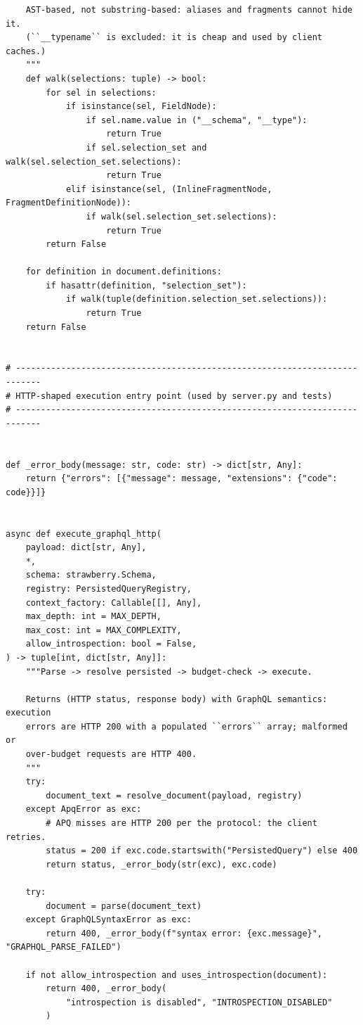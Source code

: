 \begin{verbatim}
    AST-based, not substring-based: aliases and fragments cannot hide it.
    (``__typename`` is excluded: it is cheap and used by client caches.)
    """
    def walk(selections: tuple) -> bool:
        for sel in selections:
            if isinstance(sel, FieldNode):
                if sel.name.value in ("__schema", "__type"):
                    return True
                if sel.selection_set and walk(sel.selection_set.selections):
                    return True
            elif isinstance(sel, (InlineFragmentNode, FragmentDefinitionNode)):
                if walk(sel.selection_set.selections):
                    return True
        return False

    for definition in document.definitions:
        if hasattr(definition, "selection_set"):
            if walk(tuple(definition.selection_set.selections)):
                return True
    return False


# ---------------------------------------------------------------------------
# HTTP-shaped execution entry point (used by server.py and tests)
# ---------------------------------------------------------------------------


def _error_body(message: str, code: str) -> dict[str, Any]:
    return {"errors": [{"message": message, "extensions": {"code": code}}]}


async def execute_graphql_http(
    payload: dict[str, Any],
    *,
    schema: strawberry.Schema,
    registry: PersistedQueryRegistry,
    context_factory: Callable[[], Any],
    max_depth: int = MAX_DEPTH,
    max_cost: int = MAX_COMPLEXITY,
    allow_introspection: bool = False,
) -> tuple[int, dict[str, Any]]:
    """Parse -> resolve persisted -> budget-check -> execute.

    Returns (HTTP status, response body) with GraphQL semantics: execution
    errors are HTTP 200 with a populated ``errors`` array; malformed or
    over-budget requests are HTTP 400.
    """
    try:
        document_text = resolve_document(payload, registry)
    except ApqError as exc:
        # APQ misses are HTTP 200 per the protocol: the client retries.
        status = 200 if exc.code.startswith("PersistedQuery") else 400
        return status, _error_body(str(exc), exc.code)

    try:
        document = parse(document_text)
    except GraphQLSyntaxError as exc:
        return 400, _error_body(f"syntax error: {exc.message}", "GRAPHQL_PARSE_FAILED")

    if not allow_introspection and uses_introspection(document):
        return 400, _error_body(
            "introspection is disabled", "INTROSPECTION_DISABLED"
        )


\end{verbatim}
